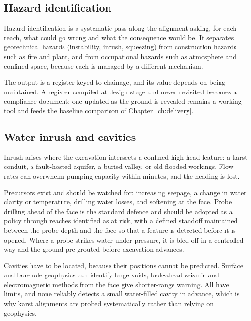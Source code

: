 \subsection{Hazard identification}
\label{sec:hazard-identification}

Hazard identification is a systematic pass along the alignment asking, for
each reach, what could go wrong and what the consequence would be. It separates
geotechnical hazards (instability, inrush, squeezing) from construction
hazards such as fire and plant, and from occupational hazards such as
atmosphere and confined space, because each is managed by a different
mechanism.

The output is a register keyed to chainage, and its value depends on being
maintained. A register compiled at design stage and never revisited becomes a
compliance document; one updated as the ground is revealed remains a working
tool and feeds the baseline comparison of
Chapter~\ref{ch:delivery}.

\subsection{Water inrush and cavities}
\label{sec:inrush-cavities}

Inrush arises where the excavation intersects a confined high-head feature:
a karst conduit, a fault-hosted aquifer, a buried valley, or old flooded
workings. Flow rates can overwhelm pumping capacity within minutes, and the
heading is lost.

Precursors exist and should be watched for: increasing seepage, a change in
water clarity or temperature, drilling water losses, and softening at the
face. Probe drilling ahead of the face is the standard defence and should be
adopted as a policy through reaches identified as at risk, with a defined
standoff maintained between the probe depth and the face so that a feature is
detected before it is opened. Where a probe strikes water under pressure, it
is bled off in a controlled way and the ground pre-grouted before excavation
advances.

Cavities have to be located, because their positions cannot be predicted. Surface and borehole
geophysics can identify large voids; look-ahead seismic and electromagnetic
methods from the face give shorter-range warning. All have limits, and none
reliably detects a small water-filled cavity in advance, which is why
karst alignments are probed systematically rather than relying on geophysics.

